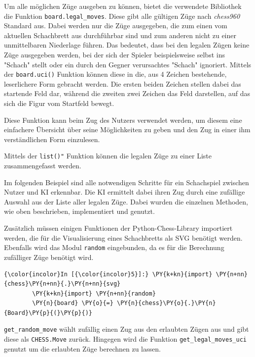 Um alle möglichen Züge ausgeben zu können, bietet die verwendete
Bibliothek die Funktion \texttt{board.legal\_moves}. Diese gibt alle
gültigen Züge nach \emph{chess960} Standard aus. Dabei werden nur die
Züge ausgegeben, die zum einen vom aktuellen Schachbrett aus
durchführbar sind und zum anderen nicht zu einer unmittelbaren
Niederlage führen. Das bedeutet, dass bei den legalen Zügen keine Züge
ausgegeben werden, bei der sich der Spieler beispielsweise selbst ins
"Schach" stellt oder ein durch den Gegner verursachtes "Schach"
ignoriert. Mittels der \texttt{board.uci()} Funktion können diese in
die, aus 4 Zeichen bestehende, leserlichere Form gebracht werden. Die
ersten beiden Zeichen stellen dabei das startende Feld dar, während die
zweiten zwei Zeichen das Feld darstellen, auf das sich die Figur vom
Startfeld bewegt.

Diese Funktion kann beim Zug des Nutzers verwendet werden, um diesem
eine einfachere Übersicht über seine Möglichkeiten zu geben und den Zug
in einer ihm verständlichen Form einzulesen.

Mittels der \texttt{list()"} Funktion können die legalen Züge zu einer
Liste zusammengefasst werden.

Im folgenden Beispiel sind alle notwendigen Schritte für ein Schachspiel
zwischen Nutzer und KI erkennbar. Die KI ermittelt dabei ihren Zug durch
eine zufällige Auswahl aus der Liste aller legalen Züge. Dabei wurden
die einzelnen Methoden, wie oben beschrieben, implementiert und genutzt.

Zusätzlich müssen einigen Funktionen der Python-Chess-Library importiert
werden, die für die Visualisierung eines Schachbretts als SVG benötigt
werden. Ebenfalls wird das Modul \texttt{random} eingebunden, da es für
die Berechnung zufälliger Züge benötigt wird.

    \begin{Verbatim}[commandchars=\\\{\}]
{\color{incolor}In [{\color{incolor}5}]:} \PY{k+kn}{import} \PY{n+nn}{chess}\PY{n+nn}{.}\PY{n+nn}{svg}
        \PY{k+kn}{import} \PY{n+nn}{random}
        \PY{n}{board} \PY{o}{=} \PY{n}{chess}\PY{o}{.}\PY{n}{Board}\PY{p}{(}\PY{p}{)}
\end{Verbatim}


    \texttt{get\_random\_move} wählt zufällig einen Zug aus den erlaubten
Zügen aus und gibt diese als \texttt{CHESS.Move} zurück. Hingegen wird
die Funktion \texttt{get\_legal\_moves\_uci} genutzt um die erlaubten
Züge berechnen zu lassen.

